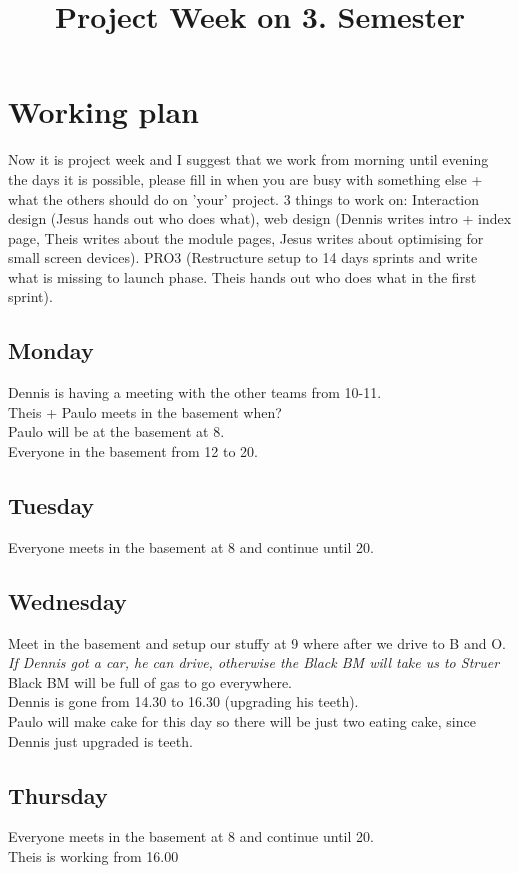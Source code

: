 \documentclass[10pt,a4paper]{article}
\title{Project Week on 3. Semester}
\begin{document}
\maketitle
\section{Working plan}
Now it is project week and I suggest that we work from morning until evening the days it is possible, please fill in when you are busy with something else + what the others should do on 'your' project.
3 things to work on: Interaction design (Jesus hands out who does what), web design (Dennis writes intro + index page, Theis writes about the module pages, Jesus writes about optimising for small screen devices). PRO3 (Restructure setup to 14 days sprints and write what is missing to launch phase. Theis hands out who does what in the first sprint).
\subsection{Monday}
Dennis is having a meeting with the other teams from 10-11.
\\Theis + Paulo meets in the basement when?
\\Paulo will be at the basement at 8.
\\Everyone in the basement from 12 to 20.
\subsection{Tuesday}
Everyone meets in the basement at 8 and continue until 20.
\subsection{Wednesday}
Meet in the basement and setup our stuffy at 9 where after we drive to B and O.
\\ \textit{If Dennis got a car, he can drive, otherwise the Black BM will take us to Struer}
\\ Black BM will be full of gas to go everywhere.
\\ Dennis is gone from 14.30 to 16.30 (upgrading his teeth).
\\ Paulo will make cake for this day so there will be just two eating cake, since Dennis just upgraded is teeth.
\subsection{Thursday}
Everyone meets in the basement at 8 and continue until 20.
\\ Theis is working from 16.00
\end{document}
